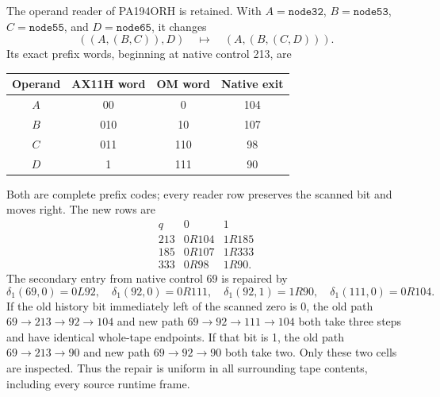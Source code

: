 The operand reader of PA194ORH is retained.  With
$A=\texttt{node32}$, $B=\texttt{node53}$,
$C=\texttt{node55}$, and $D=\texttt{node65}$, it changes
\[
        ((A,(B,C)),D)\quad\longmapsto\quad(A,(B,(C,D))).
                                                               \tag{OM1}
\]
Its exact prefix words, beginning at native control 213, are
\begin{center}
\begin{tabular}{cccc}
\toprule
Operand&AX11H word&OM word&Native exit\\\midrule
$A$&00&0&104\\
$B$&010&10&107\\
$C$&011&110&98\\
$D$&1&111&90\\\bottomrule
\end{tabular}
\end{center}
Both are complete prefix codes; every reader row preserves the scanned
bit and moves right.  The new rows are
\[
\begin{array}{c|cc}
q&0&1\\\hline
213&0R104&1R185\\
185&0R107&1R333\\
333&0R98&1R90.
\end{array}                                                  \tag{OM2}
\]
The secondary entry from native control 69 is repaired by
\[
 \delta_1(69,0)=0L92,\quad
 \delta_1(92,0)=0R111,\quad \delta_1(92,1)=1R90,
 \quad\delta_1(111,0)=0R104.                                \tag{OM3}
\]
If the old history bit immediately left of the scanned zero is 0,
the old path $69\to213\to92\to104$ and new path
$69\to92\to111\to104$ both take three steps and have identical
whole-tape endpoints.  If that bit is 1, the old path
$69\to213\to90$ and new path $69\to92\to90$ both take two.
Only these two cells are inspected.  Thus the repair is uniform in all
surrounding tape contents, including every source runtime frame.

